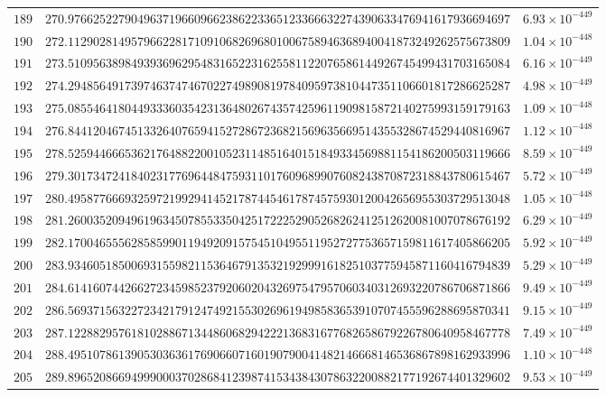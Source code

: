 \documentclass[12pt,reqno]{amsart}
\theoremstyle{remark}
\begin{document}
\begin{longtable}{clc}
$189$ & $270.9766252279049637196609662386223365123366632274390633476941617936694697$ & $6.93\times 10^{-449}$ \\
$190$ & $272.1129028149579662281710910682696801006758946368940041873249262575673809$ & $1.04\times 10^{-448}$ \\
$191$ & $273.5109563898493936962954831652231625581122076586144926745499431703165084$ & $6.16\times 10^{-449}$ \\
$192$ & $274.2948564917397463747467022749890819784095973810447351106601817286625287$ & $4.98\times 10^{-449}$ \\
$193$ & $275.0855464180449333603542313648026743574259611909815872140275993159179163$ & $1.09\times 10^{-448}$ \\
$194$ & $276.8441204674513326407659415272867236821569635669514355328674529440816967$ & $1.12\times 10^{-448}$ \\
$195$ & $278.5259446665362176488220010523114851640151849334569881154186200503119666$ & $8.59\times 10^{-449}$ \\
$196$ & $279.3017347241840231776964484759311017609689907608243870872318843780615467$ & $5.72\times 10^{-449}$ \\
$197$ & $280.4958776669325972199294145217874454617874575930120042656955303729513048$ & $1.05\times 10^{-448}$ \\
$198$ & $281.2600352094961963450785533504251722252905268262412512620081007078676192$ & $6.29\times 10^{-449}$ \\
$199$ & $282.1700465556285859901194920915754510495511952727753657159811617405866205$ & $5.92\times 10^{-449}$ \\
$200$ & $283.9346051850069315598211536467913532192999161825103775945871160416794839$ & $5.29\times 10^{-449}$ \\
$201$ & $284.6141607442662723459852379206020432697547957060340312693220786706871866$ & $9.49\times 10^{-449}$ \\
$202$ & $286.5693715632272342179124749215530269619498583653910707455596288695870341$ & $9.15\times 10^{-449}$ \\
$203$ & $287.1228829576181028867134486068294222136831677682658679226780640958467778$ & $7.49\times 10^{-449}$ \\
$204$ & $288.4951078613905303636176906607160190790041482146668146536867898162933996$ & $1.10\times 10^{-448}$ \\
$205$ & $289.8965208669499900037028684123987415343843078632200882177192674401329602$ & $9.53\times 10^{-449}$ \\

\end{longtable}
\end{document}
